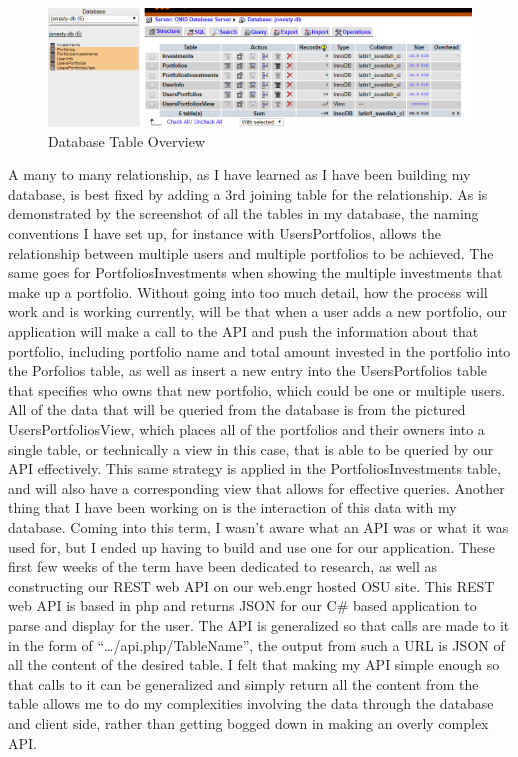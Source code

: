 \documentclass[letterpaper,10pt,titlepage,journal,compsoc,draftclsnofoot,onecolumn]{IEEEtran}
\begin{document}
\begin{figure}[h]
\caption{Database Table Overview}
\centering
\includegraphics[width=\textwidth]{database_screenshot}
\end{figure}
A many to many relationship, as I have learned as I have been building my database, is best fixed by adding a 3rd joining table for the relationship. As is demonstrated by the screenshot of all the tables in my database, the naming conventions I have set up, for instance with UsersPortfolios, allows the relationship between multiple users and multiple portfolios to be achieved. The same goes for PortfoliosInvestments when showing the multiple investments that make up a portfolio. Without going into too much detail, how the process will work and is working currently, will be that when a user adds a new portfolio, our application will make a call to the API and push the information about that portfolio, including portfolio name and total amount invested in the portfolio into the Porfolios table, as well as insert a new entry into the UsersPortfolios table that specifies who owns that new portfolio, which could be one or multiple users. All of the data that will be queried from the database is from the pictured UsersPortfoliosView, which places all of the portfolios and their owners into a single table, or technically a view in this case, that is able to be queried by our API effectively. This same strategy is applied in the PortfoliosInvestments table, and will also have a corresponding view that allows for effective queries.
Another thing that I have been working on is the interaction of this data with my database. Coming into this term, I wasn’t aware what an API was or what it was used for, but I ended up having to build and use one for our application. These first few weeks of the term have been dedicated to research, as well as constructing our REST web API on our web.engr hosted OSU site. This REST web API is based in php and returns JSON for our C\# based application to parse and display for the user.  The API is generalized so that calls are made to it in the form of “…/api.php/{TableName}”, the output from such a URL is JSON of all the content of the desired table. I felt that making my API simple enough so that calls to it can be generalized and simply return all the content from the table allows me to do my complexities involving the data  through the database and client side, rather than getting bogged down in making an overly complex API. 
\end{document}

